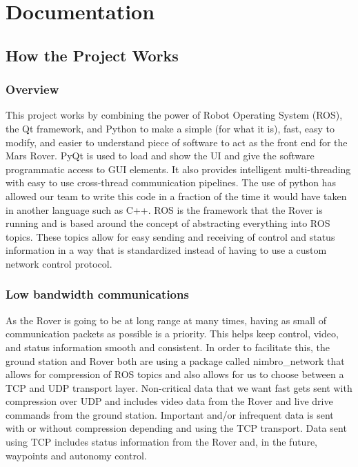 \section{Documentation}
\subsection{How the Project Works}
\subsubsection{Overview}
This project works by combining the power of Robot Operating System (ROS), the Qt framework, and Python to make a simple (for what it is), fast, easy to modify, and easier to understand piece of software to act as the front end for the Mars Rover. PyQt is used to load and show the UI and give the software programmatic access to GUI elements. It also provides intelligent multi-threading with easy to use cross-thread communication pipelines. The use of python has allowed our team to write this code in a fraction of the time it would have taken in another language such as C++. ROS is the framework that the Rover is running and is based around the concept of abstracting everything into ROS topics. These topics allow for easy sending and receiving of control and status information in a way that is standardized instead of having to use a custom network control protocol.

\subsubsection{Low bandwidth communications}
As the Rover is going to be at long range at many times, having as small of communication packets as possible is a priority. This helps keep control, video, and status information smooth and consistent. In order to facilitate this, the ground station and Rover both are using a package called nimbro\_network that allows for compression of ROS topics and also allows for us to choose between a TCP and UDP transport layer. Non-critical data that we want fast gets sent with compression over UDP and includes video data from the Rover and live drive commands from the ground station. Important and/or infrequent data is sent with or without compression depending and using the TCP transport. Data sent using TCP includes status information from the Rover and, in the future, waypoints and autonomy control. 


